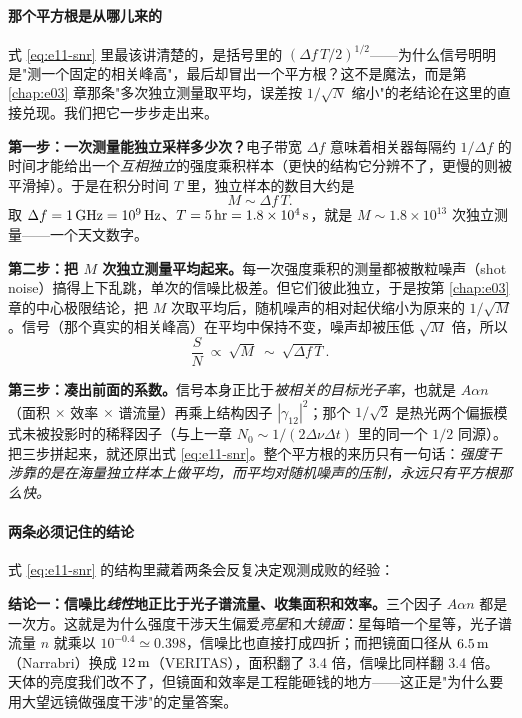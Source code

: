 \paragraph{那个平方根是从哪儿来的}
\label{sec:e11-snr-sqrt}

式 \eqref{eq:e11-snr} 里最该讲清楚的，是括号里的 \((\Delta f\,T/2)^{1/2}\)——为什么信号明明是"测一个固定的相关峰高"，最后却冒出一个平方根？这不是魔法，而是第 \ref{chap:e03} 章那条"多次独立测量取平均，误差按 \(1/\sqrt{N}\) 缩小"的老结论在这里的直接兑现。我们把它一步步走出来。

\textbf{第一步：一次测量能独立采样多少次？}电子带宽 \(\Delta f\) 意味着相关器每隔约 \(1/\Delta f\) 的时间才能给出一个\emph{互相独立}的强度乘积样本（更快的结构它分辨不了，更慢的则被平滑掉）。于是在积分时间 \(T\) 里，独立样本的数目大约是
\[
  M \sim \Delta f\,T .
\]
取 \(\Delta f=1\,{\rm GHz}=10^9\,{\rm Hz}\)、\(T=5\,{\rm hr}=1.8\times10^4\,{\rm s}\)，就是 \(M\sim1.8\times10^{13}\) 次独立测量——一个天文数字。

\textbf{第二步：把 \(M\) 次独立测量平均起来。}每一次强度乘积的测量都被散粒噪声（shot noise）搞得上下乱跳，单次的信噪比极差。但它们彼此独立，于是按第 \ref{chap:e03} 章的中心极限结论，把 \(M\) 次取平均后，随机噪声的相对起伏缩小为原来的 \(1/\sqrt{M}\)。信号（那个真实的相关峰高）在平均中保持不变，噪声却被压低 \(\sqrt{M}\) 倍，所以
\[
  \frac{S}{N}\ \propto\ \sqrt{M}\ \sim\ \sqrt{\Delta f\,T}.
\]

\textbf{第三步：凑出前面的系数。}信号本身正比于\emph{被相关的目标光子率}，也就是 \(A\alpha n\)（面积 \(\times\) 效率 \(\times\) 谱流量）再乘上结构因子 \(|\gamma_{12}|^2\)；那个 \(1/\sqrt2\) 是热光两个偏振模式未被投影时的稀释因子（与上一章 \(N_0\sim1/(2\Delta\nu\Delta t)\) 里的同一个 \(1/2\) 同源）。把三步拼起来，就还原出式 \eqref{eq:e11-snr}。整个平方根的来历只有一句话：\emph{强度干涉靠的是在海量独立样本上做平均，而平均对随机噪声的压制，永远只有平方根那么快。}

\paragraph{两条必须记住的结论}
\label{sec:e11-snr-lessons}

式 \eqref{eq:e11-snr} 的结构里藏着两条会反复决定观测成败的经验：

\textbf{结论一：信噪比\emph{线性}地正比于光子谱流量、收集面积和效率。}三个因子 \(A\alpha n\) 都是一次方。这就是为什么强度干涉天生偏爱\emph{亮星}和\emph{大镜面}：星每暗一个星等，光子谱流量 \(n\) 就乘以 \(10^{-0.4}\simeq0.398\)，信噪比也直接打成四折；而把镜面口径从 \(6.5\,{\rm m}\)（Narrabri）换成 \(12\,{\rm m}\)（VERITAS），面积翻了 3.4 倍，信噪比同样翻 3.4 倍。天体的亮度我们改不了，但镜面和效率是工程能砸钱的地方——这正是"为什么要用大望远镜做强度干涉"的定量答案。

